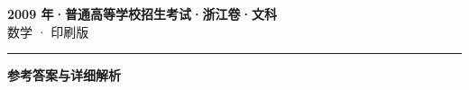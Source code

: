 \documentclass[zihao=5, a4paper]{ctexart}
\begin{document}
\begin{center}
  {\Large\bfseries 2009 年·普通高等学校招生考试·浙江卷·文科}\\[4pt]
  {\large 数学 · 印刷版}
\end{center}
\medskip
{}

\par\bigskip\hrule\bigskip
{}
\begin{center}{\large\bfseries 参考答案与详细解析}\end{center}
\smallskip

\end{document}
